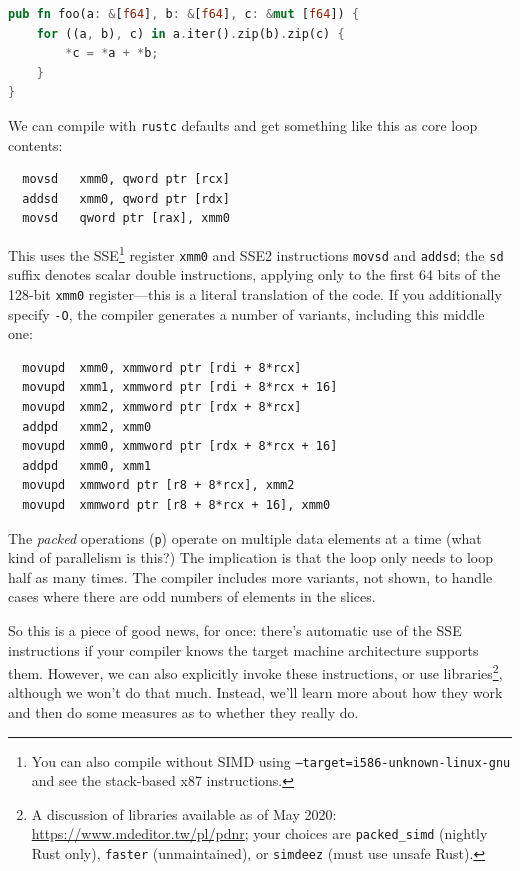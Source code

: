 \documentclass[a4paper]{report}
\begin{document}
\begin{lstlisting}[language=Rust]
pub fn foo(a: &[f64], b: &[f64], c: &mut [f64]) {
    for ((a, b), c) in a.iter().zip(b).zip(c) {
        *c = *a + *b;
    }
}\end{lstlisting}


We can compile with \texttt{rustc} defaults
and get something like this as core loop contents:
\begin{verbatim}
  movsd   xmm0, qword ptr [rcx]
  addsd   xmm0, qword ptr [rdx]
  movsd   qword ptr [rax], xmm0
\end{verbatim}
This uses the SSE\footnote{You can also compile without SIMD using \texttt{--target=i586-unknown-linux-gnu} and see the stack-based x87 instructions.} register \texttt{xmm0} and SSE2 instructions \texttt{movsd} and
\texttt{addsd}; the \texttt{sd} suffix denotes scalar double instructions, applying
only to the first 64 bits of the 128-bit \texttt{xmm0} register---this is a literal
translation of the code. If you additionally specify \texttt{-O}, the compiler generates a number of variants, including this middle one:
\begin{verbatim}
  movupd  xmm0, xmmword ptr [rdi + 8*rcx]
  movupd  xmm1, xmmword ptr [rdi + 8*rcx + 16]
  movupd  xmm2, xmmword ptr [rdx + 8*rcx]
  addpd   xmm2, xmm0
  movupd  xmm0, xmmword ptr [rdx + 8*rcx + 16]
  addpd   xmm0, xmm1
  movupd  xmmword ptr [r8 + 8*rcx], xmm2
  movupd  xmmword ptr [r8 + 8*rcx + 16], xmm0
\end{verbatim}
The \emph{packed} operations ({\tt p}) operate on multiple data
elements at a time (what kind of parallelism is this?)  The
implication is that the loop only needs to loop half as many times.
The compiler includes more variants, not shown, to handle cases where
there are odd numbers of elements in the slices.

So this is a piece of good news, for once: there's automatic use of the SSE instructions if your compiler knows the target machine architecture supports them. However, we can also explicitly invoke these instructions, or use libraries\footnote{A discussion of libraries available as of May 2020: \url{https://www.mdeditor.tw/pl/pdnr}; your choices are \texttt{packed\_simd} (nightly Rust only), \texttt{faster} (unmaintained), or \texttt{simdeez} (must use unsafe Rust).}, although we won't do that much. Instead, we'll learn more about how they work and then do some measures as to whether they really do.
\end{document}
